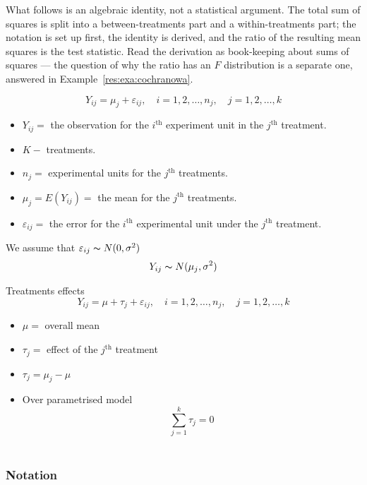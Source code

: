 \documentclass[11pt,a4paper]{article}
\theoremstyle{definition}
\begin{document}
What follows is an algebraic identity, not a statistical argument. The total
sum of squares is split into a between-treatments part and a within-treatments
part; the notation is set up first, the identity is derived, and the ratio of
the resulting mean squares is the test statistic. Read the derivation as
book-keeping about sums of squares --- the question of why the ratio has an $F$
distribution is a separate one, answered in Example~\ref{res:exa:cochranowa}.

$$Y_{ij}=\mu_j+\varepsilon_{ij},\quad  i=1,2,\ldots ,n_j,\quad  j=1,2,\ldots ,k$$
\begin{itemize}
\item[] $Y_{ij}=$ the observation for the $i^{\text{th}}$ experiment unit in the $j^{\text{th}}$ treatment.
\item[] $K-$ treatments. 
\item[] $n_j=$ experimental units for the $j^{\text{th}}$ treatments.
\item[] $\mu_j=E(Y_{ij})=$ the mean for the $j^{\text{th}}$ treatments.
\item[] $\varepsilon_{ij}=$ the  error for the $i^{\text{th}}$ experimental unit under the $j^{\text{th}}$ treatment.\\ 
\end{itemize}

We assume that $\varepsilon_{ij}\thicksim N(0,\sigma^2)$
$$Y_{ij}\thicksim N(\mu_j,\sigma^2)$$

Treatments effects
$$Y_{ij}=\mu +\tau_j +\varepsilon_{ij},\quad  i=1,2,\ldots ,n_j,\quad  j=1,2,\ldots ,k$$
\begin{itemize}
\item[] $\mu=$ overall mean
\item[] $\tau_j=$ effect of the $j^{\text{th}}$ treatment
\item[] $\tau_j=\mu_j-\mu$\\
\item[] Over parametrised model $$\sum^k_{j=1}\tau_j=0$$\\
\end{itemize}


\subsubsection*{Notation}
\end{document}
